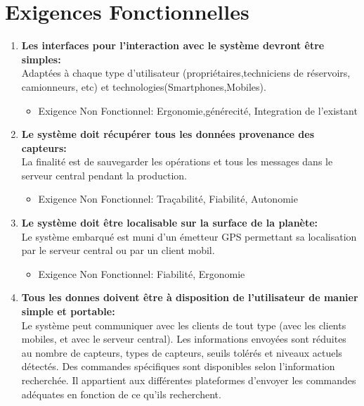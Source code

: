 \documentclass [a4paper] {report}
\begin{document}
\section{Exigences Fonctionnelles}
\begin{enumerate}



\item  \textbf{Les interfaces pour l'interaction avec le système devront être simples:}\\
Adaptées à chaque type d'utilisateur (propriétaires,techniciens de réservoirs, camionneurs, etc) et technologies(Smartphones,Mobiles).
\begin{itemize}

\item Exigence Non Fonctionnel: Ergonomie,générecité, Integration de l'existant
\end{itemize}
\item  \textbf{Le système doit récupérer tous les données provenance des capteurs:}\\
La finalité est de sauvegarder les opérations et tous les messages dans le serveur central pendant la production.
\begin{itemize}

\item Exigence Non Fonctionnel: Traçabilité, Fiabilité, Autonomie
\end{itemize}
\item  \textbf{Le système doit être localisable sur la surface de la planète:}\\
Le système embarqué est muni d'un émetteur GPS permettant sa localisation par le serveur central ou par un client mobil.
\begin{itemize}

\item Exigence Non Fonctionnel: Fiabilité, Ergonomie
\end{itemize}
\item  \textbf{Tous les donnes doivent être à disposition de l'utilisateur de manier simple et portable:}\\
Le système peut communiquer avec les clients de tout type (avec les clients mobiles, et avec le serveur central). Les informations envoyées sont réduites au nombre de capteurs, types de capteurs, seuils tolérés et niveaux actuels détectés. Des commandes spécifiques sont disponibles selon l'information recherchée. Il appartient aux différentes plateformes d'envoyer les commandes adéquates en fonction de ce qu'ils recherchent.
\begin{itemize}


\end{itemize}
\end{enumerate}
\end{document}
